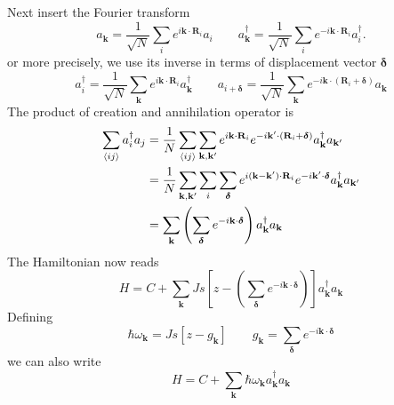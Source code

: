 \documentclass[../../../main.tex]{subfiles}
\begin{document}
Next insert the Fourier transform
\begin{equation*}
    a_{\mathbf{k}} = \frac{1}{\sqrt{N}}\sum_{i} e^{ i\mathbf{k}\cdot\mathbf{R}_{i}}a_{i}\qquad
    a_{\mathbf{k}}^{\dagger} = \frac{1}{\sqrt{N}}\sum_{i} e^{- i\mathbf{k}\cdot\mathbf{R}_{i}} a_{i}^{\dagger}.
\end{equation*}
or more precisely, we use its inverse in terms of displacement vector $\boldsymbol{\delta}$
\begin{equation*}
    a_i^\dagger = \frac{1}{\sqrt{N}}\sum_\mathbf{k} e^{i\mathbf{k}\cdot\mathbf{R}_i} a_\mathbf{k}^\dagger\qquad
    a_{i+\boldsymbol{\delta}} = \frac{1}{\sqrt{N}}\sum_\mathbf{k} e^{-i\mathbf{k}\cdot(\mathbf{R}_i+\boldsymbol{\delta})} a_\mathbf{k}
\end{equation*}
The product of creation and annihilation operator is
\begin{align*}
    \sum_{\braket{ i j}} a_i^\dagger a_j
     & =  \frac{1}{N} \sum_{\braket{ i j}} \sum_{\mathbf{k},\mathbf{k}'} e^{i\mathbf{k}\cdot\mathbf{R}_i} e^{-i\mathbf{k}'\cdot(\mathbf{R}_i+\boldsymbol{\delta})} a_{\mathbf{k}}^{\dagger}a_{\mathbf{k}'}              \\
     & =  \frac{1}{N} \sum_{\mathbf{k},\mathbf{k}'}\sum_i\sum_{\boldsymbol{\delta}} e^{i(\mathbf{k}-\mathbf{k}')\cdot\mathbf{R}_i}  e^{-i\mathbf{k}'\cdot\boldsymbol{\delta}}  a_{\mathbf{k}}^{\dagger} a_{\mathbf{k}'} \\
     & =  \sum_{\mathbf{k}} \left(\sum_{\boldsymbol{\delta}} e^{-i \mathbf{k}\cdot \boldsymbol{\delta}}\right) a_{\mathbf{k}}^{\dagger} a_{\mathbf{k}}
\end{align*}
The Hamiltonian now reads
\begin{equation*}
    H = C +  \sum_{\mathbf{k}} Js\left[z - \left(\sum_{\boldsymbol{\delta}} e^{-i \mathbf{k}\cdot \boldsymbol{\delta}}\right) \right] a_{\mathbf{k}}^\dagger a_{\mathbf{k}}
\end{equation*}
Defining
\begin{equation*}
    \hbar \omega_{\mathbf{k }} = Js\left[z - g_\mathbf{k }  \right]
    \qquad
    g_\mathbf{k } = \sum_{\boldsymbol{\delta}} e^{-i \mathbf{k}\cdot \boldsymbol{\delta}}
\end{equation*}
we can also write
\begin{equation*}
    H = C +  \sum_{\mathbf{k}}\hbar \omega_{\mathbf{k }}a_{\mathbf{k}}^\dagger a_{\mathbf{k}}
\end{equation*}
\end{document}
